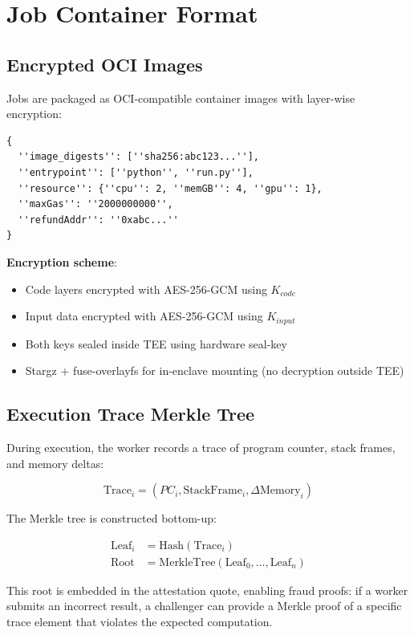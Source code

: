 \section{Job Container Format}

\label{sec:containers}

\subsection{Encrypted OCI Images}

Jobs are packaged as OCI-compatible container images with layer-wise encryption:

\begin{lstlisting}[caption={Job Container Manifest},label={lst:container}]
{
  ''image_digests'': [''sha256:abc123...''],
  ''entrypoint'': [''python'', ''run.py''],
  ''resource'': {''cpu'': 2, ''memGB'': 4, ''gpu'': 1},
  ''maxGas'': ''2000000000'',
  ''refundAddr'': ''0xabc...''
}
\end{lstlisting}

\textbf{Encryption scheme}:
\begin{itemize}
  \item Code layers encrypted with AES-256-GCM using $K_{code}$
  \item Input data encrypted with AES-256-GCM using $K_{input}$
  \item Both keys sealed inside TEE using hardware seal-key
  \item Stargz + fuse-overlayfs for in-enclave mounting (no decryption outside TEE)
\end{itemize}

\subsection{Execution Trace Merkle Tree}

During execution, the worker records a trace of program counter, stack frames, and memory deltas:

\begin{equation}
\text{Trace}_i = (PC_i, \text{StackFrame}_i, \Delta\text{Memory}_i)
\end{equation}

The Merkle tree is constructed bottom-up:

\begin{align}
\text{Leaf}_i &= \text{Hash}(\text{Trace}_i) \\
\text{Root} &= \text{MerkleTree}(\text{Leaf}_0, \ldots, \text{Leaf}_n)
\end{align}

This root is embedded in the attestation quote, enabling fraud proofs: if a worker submits an incorrect result, a challenger can provide a Merkle proof of a specific trace element that violates the expected computation.

